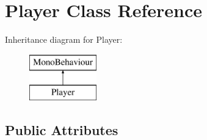 \hypertarget{class_player}{}\section{Player Class Reference}
\label{class_player}
Inheritance diagram for Player\+:\begin{figure}[H]
\begin{center}
\leavevmode
\includegraphics[height=2.000000cm]{class_player}
\end{center}
\end{figure}
\subsection*{Public Attributes}

